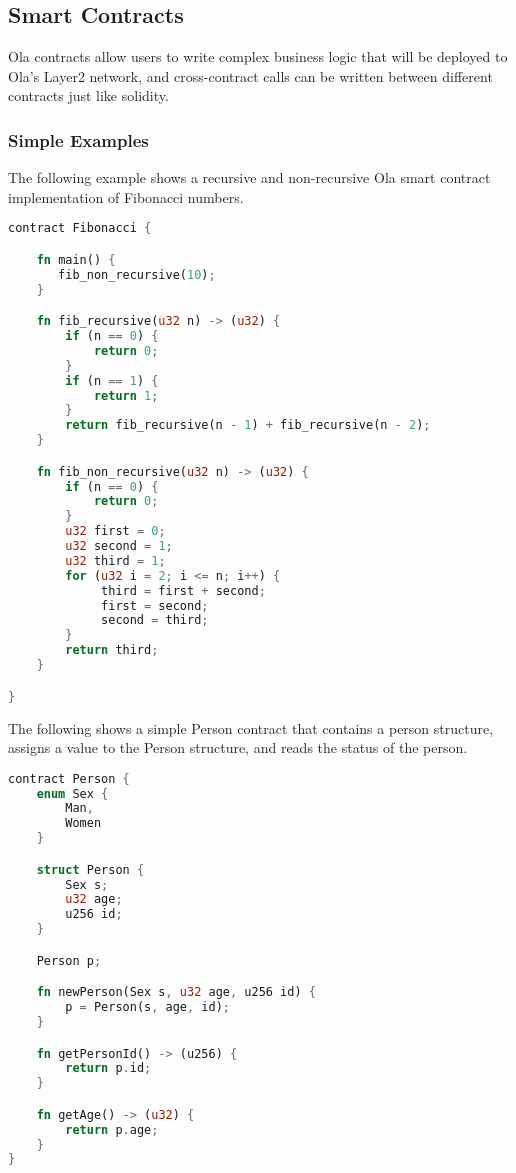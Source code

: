 \subsection{Smart Contracts}


Ola contracts allow users to write complex business logic that will be deployed to Ola's Layer2 network, and cross-contract calls can be written between different contracts just like solidity.

\subsubsection{Simple Examples}

The following example shows a recursive and non-recursive Ola smart contract implementation of Fibonacci numbers.

\begin{lstlisting}[language=rust]
contract Fibonacci {

    fn main() {
       fib_non_recursive(10);
    }

    fn fib_recursive(u32 n) -> (u32) {
        if (n == 0) {
            return 0;
        }
        if (n == 1) {
            return 1;
        }
        return fib_recursive(n - 1) + fib_recursive(n - 2);
    }

    fn fib_non_recursive(u32 n) -> (u32) {
        if (n == 0) {
            return 0;
        }
        u32 first = 0;
        u32 second = 1;
        u32 third = 1;
        for (u32 i = 2; i <= n; i++) {
             third = first + second;
             first = second;
             second = third;
        }
        return third;
    }

}
\end{lstlisting}

The following shows a simple Person contract that contains a person structure, assigns a value to the Person structure, and reads the status of the person.

\begin{lstlisting}[language=rust]
contract Person {
    enum Sex {
        Man,
        Women
    }

    struct Person {
        Sex s;
        u32 age;
        u256 id;
    }

    Person p;

    fn newPerson(Sex s, u32 age, u256 id) {
        p = Person(s, age, id);
    }

    fn getPersonId() -> (u256) {
        return p.id;
    }

    fn getAge() -> (u32) {
        return p.age;
    }
}
\end{lstlisting}

